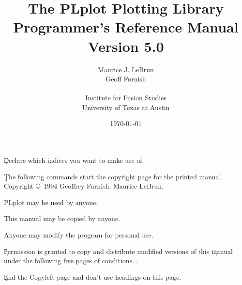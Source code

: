 %
%
%
%
%
%
%

\pagestyle{headings}



\c Declare which indices you want to make use of.

\title{ The PLplot Plotting Library \\ 
        Programmer's Reference Manual \\
        Version 5.0}
\author{
        Maurice J. LeBrun\\
        Geoff Furnish\\
\\
        Institute for Fusion Studies\\
        University of Texas at Austin\\
        }

\date{\today}
\maketitle

\c The following commands start the copyright page for the printed manual.
\clearpage
\vspace{0pt plus 1filll}
Copyright \copyright\ 1994 Geoffrey Furnish, Maurice LeBrun.

PLplot may be used by anyone.

This manual may be copied by anyone.

Anyone may modify the program for personal use.

\c Permission is granted to copy and distribute modified versions of this
\c manual under the following five pages of conditions...

\c End the Copyleft page and don't use headings on this page.
\clearpage
\pagestyle{headings}

